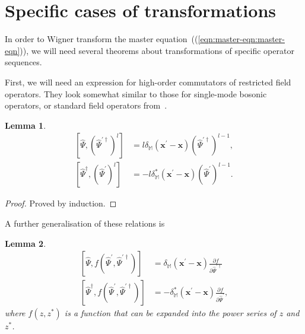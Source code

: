 \documentclass[12pt,aip,jmp,amssymb,amsmath]{revtex4-1}
\newtheorem{lemma}{Lemma}
\begin{document}
\section{Specific cases of transformations}

In order to Wigner transform the master equation~((\ref{eqn:master-eqn:master-eqn})), we will need several theorems about transformations of specific operator sequences.

First, we will need an expression for high-order commutators of restricted field operators.
They look somewhat similar to those for single-mode bosonic operators, or standard field operators from~\cite{Louisell1990}.

\begin{lemma}
    \begin{eqnarray*}
        \left[ \hat{\Psi}, ( \hat{\Psi}^{\prime\dagger} )^l \right]
        & = l \delta_{\mathbb{M}} (\boldsymbol{x}^\prime - \boldsymbol{x}) ( \hat{\Psi}^{\prime\dagger} )^{l-1}, \\
        \left[ \hat{\Psi}^\dagger, ( \hat{\Psi}^\prime )^l \right]
        & = - l \delta_{\mathbb{M}}^* (\boldsymbol{x}^\prime - \boldsymbol{x}) ( \hat{\Psi}^\prime )^{l-1}.
    \end{eqnarray*}
\end{lemma}
\begin{proof}
Proved by induction.
\end{proof}

A further generalisation of these relations is

\begin{lemma}
\label{lmm:func-operators:functional-commutators}
    \begin{eqnarray*}
        \left[ \hat{\Psi}, f( \hat{\Psi}^\prime, \hat{\Psi}^{\prime\dagger} ) \right]
        & = \delta_{\mathbb{M}} (\boldsymbol{x}^\prime - \boldsymbol{x}) \frac{\partial f}{\partial \hat{\Psi}^{\prime\dagger}} \\
        \left[ \hat{\Psi}^\dagger, f( \hat{\Psi}^\prime, \hat{\Psi}^{\prime\dagger} ) \right]
        & = -\delta_{\mathbb{M}}^* (\boldsymbol{x}^\prime - \boldsymbol{x}) \frac{\partial f}{\partial \hat{\Psi}^\prime},
    \end{eqnarray*}
    where $f(z, z^*)$ is a function that can be expanded into the power series of $z$ and $z^*$.
\end{lemma}
\end{document}
